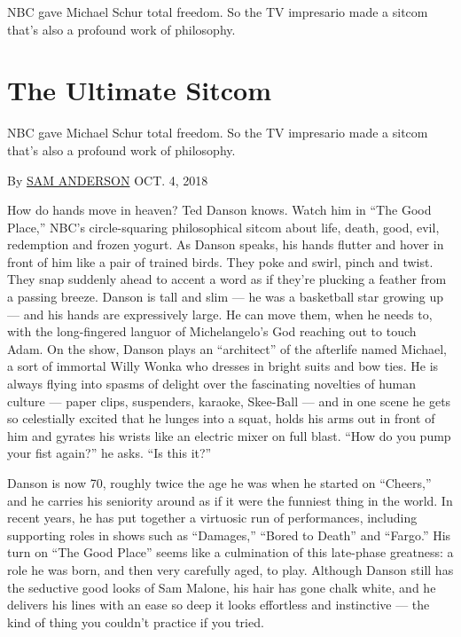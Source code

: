 NBC gave Michael Schur total freedom. So the TV impresario made a sitcom
that's also a profound work of philosophy.

\hypertarget{the-ultimate-sitcom}{%
\section{The Ultimate Sitcom}\label{the-ultimate-sitcom}}

NBC gave Michael Schur total freedom. So the TV impresario made a sitcom
that's also a profound work of philosophy.

By \href{https://www.nytimes3xbfgragh.onion/by/sam-anderson}{SAM
ANDERSON} OCT. 4, 2018

How do hands move in heaven? Ted Danson knows. Watch him in ``The Good
Place,'' NBC's circle-squaring philosophical sitcom about life, death,
good, evil, redemption and frozen yogurt. As Danson speaks, his hands
flutter and hover in front of him like a pair of trained birds. They
poke and swirl, pinch and twist. They snap suddenly ahead to accent a
word as if they're plucking a feather from a passing breeze. Danson is
tall and slim --- he was a basketball star growing up --- and his hands
are expressively large. He can move them, when he needs to, with the
long-fingered languor of Michelangelo's God reaching out to touch Adam.
On the show, Danson plays an ``architect'' of the afterlife named
Michael, a sort of immortal Willy Wonka who dresses in bright suits and
bow ties. He is always flying into spasms of delight over the
fascinating novelties of human culture --- paper clips, suspenders,
karaoke, Skee-Ball --- and in one scene he gets so celestially excited
that he lunges into a squat, holds his arms out in front of him and
gyrates his wrists like an electric mixer on full blast. ``How do you
pump your fist again?'' he asks. ``Is this it?''

Danson is now 70, roughly twice the age he was when he started on
``Cheers,'' and he carries his seniority around as if it were the
funniest thing in the world. In recent years, he has put together a
virtuosic run of performances, including supporting roles in shows such
as ``Damages,'' ``Bored to Death'' and ``Fargo.'' His turn on ``The Good
Place'' seems like a culmination of this late-phase greatness: a role he
was born, and then very carefully aged, to play. Although Danson still
has the seductive good looks of Sam Malone, his hair has gone chalk
white, and he delivers his lines with an ease so deep it looks
effortless and instinctive --- the kind of thing you couldn't practice
if you tried.


